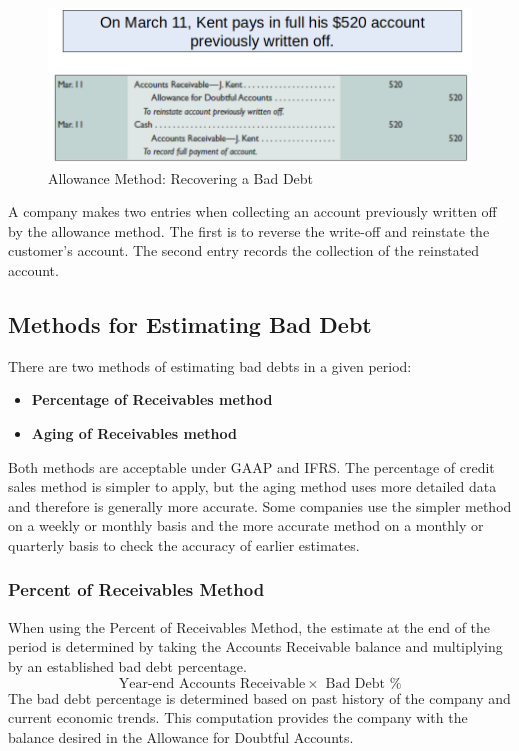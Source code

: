 \documentclass[../main.tex]{subfiles}
\begin{document}
	\begin{figure}[ht]
		\centering
		\includegraphics[width=\columnwidth]{images/c6/allowance_recovery.png}
		\caption{Allowance Method: Recovering a Bad Debt}
	\end{figure}
	
	A company makes two entries when collecting an account 
	previously written off by the allowance method. The first is to reverse the 
	write-off and reinstate the customer’s account. The second entry records 
	the collection of the reinstated account.
	
	\subsection{Methods for Estimating Bad Debt}
	
	There are two methods of estimating bad debts in a given period:
	\begin{itemize}[noitemsep]
		\item \textbf{Percentage of Receivables method} 
		\item \textbf{Aging of Receivables method} 
	\end{itemize}
	Both methods are acceptable under GAAP and IFRS. The percentage of credit 
	sales method is simpler to apply, but the aging method uses more detailed 
	data and therefore is generally more accurate. Some companies use the 
	simpler method on a weekly or monthly basis and the more accurate method on 
	a monthly or quarterly basis to check the accuracy of earlier estimates.
	
	\subsubsection{Percent of Receivables Method}
	
	When using the Percent of Receivables Method, the estimate at the end of 
	the period is determined by taking the Accounts Receivable balance and 
	multiplying by an established bad debt percentage. 
	\[
	\text{Year-end Accounts Receivable} \times \text { Bad Debt } \%
	\]
	The bad debt percentage 
	is determined based on past history of the company and current economic 
	trends. This computation provides the company with the balance desired in 
	the Allowance for Doubtful Accounts. 
	
\end{document}
